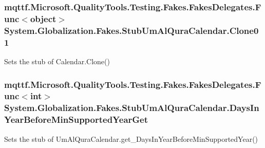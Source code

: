 \hypertarget{class_system_1_1_globalization_1_1_fakes_1_1_stub_um_al_qura_calendar_ab2c4be894ca8c30a01cbf87747a7c434}{
\subsubsection[{Clone01}]{\setlength{\rightskip}{0pt plus 5cm}mqttf.\-Microsoft.\-Quality\-Tools.\-Testing.\-Fakes.\-Fakes\-Delegates.\-Func$<$object$>$ System.\-Globalization.\-Fakes.\-Stub\-Um\-Al\-Qura\-Calendar.\-Clone01}}\label{class_system_1_1_globalization_1_1_fakes_1_1_stub_um_al_qura_calendar_ab2c4be894ca8c30a01cbf87747a7c434}


Sets the stub of Calendar.\-Clone()

\hypertarget{class_system_1_1_globalization_1_1_fakes_1_1_stub_um_al_qura_calendar_aa1a6e7733439d7adab5e67e5119ca82f}{
\subsubsection[{Days\-In\-Year\-Before\-Min\-Supported\-Year\-Get}]{\setlength{\rightskip}{0pt plus 5cm}mqttf.\-Microsoft.\-Quality\-Tools.\-Testing.\-Fakes.\-Fakes\-Delegates.\-Func$<$int$>$ System.\-Globalization.\-Fakes.\-Stub\-Um\-Al\-Qura\-Calendar.\-Days\-In\-Year\-Before\-Min\-Supported\-Year\-Get}}\label{class_system_1_1_globalization_1_1_fakes_1_1_stub_um_al_qura_calendar_aa1a6e7733439d7adab5e67e5119ca82f}


Sets the stub of Um\-Al\-Qura\-Calendar.\-get\-\_\-\-Days\-In\-Year\-Before\-Min\-Supported\-Year()

